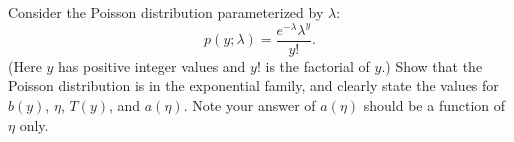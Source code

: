 \item {} Consider the Poisson distribution parameterized by
$\lambda$:
%
\begin{equation*}
  p(y; \lambda) = \frac{e^{-\lambda}\lambda^y}{y!}.
\end{equation*}
%
(Here $y$ has positive integer values and $y!$ is the factorial of $y$.) 
Show that the Poisson distribution is in the exponential family, and
clearly state the values for $b(y)$, $\eta$, $T(y)$, and $a(\eta)$.
Note your answer of $a(\eta)$ should be a function of $\eta$ only.

